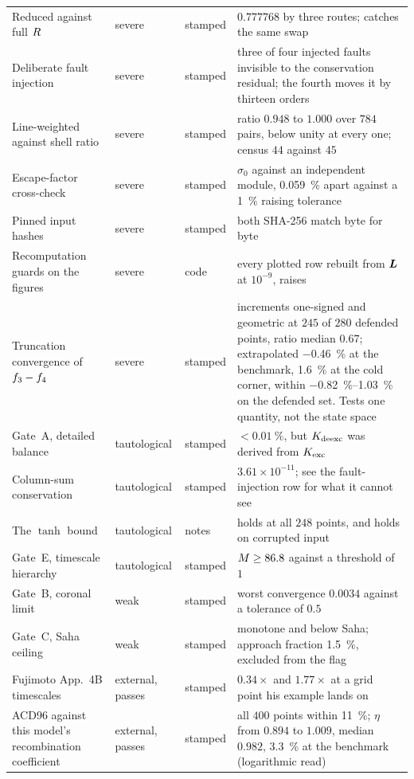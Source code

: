 \begin{table}[tbp]
\begin{tabular}{p{3.9cm}p{1.8cm}p{1.3cm}p{5.6cm}}
Reduced against full $R$ & severe & stamped & $0.777768$ by three routes; catches the same swap \\
Deliberate fault injection & severe & stamped & three of four injected faults invisible to the conservation residual; the fourth moves it by thirteen orders \\
Line-weighted against shell ratio & severe & stamped & ratio $0.948$ to $1.000$ over $784$ pairs, below unity at every one; census $44$ against $45$ \\
Escape-factor cross-check & severe & stamped & $\sigma_0$ against an independent module, \SI{0.059}{\percent} apart against a \SI{1}{\percent} raising tolerance \\
Pinned input hashes & severe & stamped & both SHA-256 match byte for byte \\
Recomputation guards on the figures & severe & code & every plotted row rebuilt from $\bm{L}$ at $10^{-9}$, raises \\
Truncation convergence of $f_{3}-f_{4}$ & severe & stamped & increments one-signed and geometric at $245$ of $280$ defended points, ratio median $0.67$; extrapolated \SI{-0.46}{\percent} at the benchmark, \SI{+1.6}{\percent} at the cold corner, within \SIrange{-0.82}{+1.03}{\percent} on the defended set. Tests one quantity, not the state space \\
Gate~A, detailed balance & tautological & stamped & $<\SI{0.01}{\percent}$, but $K_{\rm deexc}$ was derived from $K_{\rm exc}$ \\
Column-sum conservation & tautological & stamped & $3.61\times10^{-11}$; see the fault-injection row for what it cannot see \\
The $\tanh$ bound & tautological & notes & holds at all $248$ points, and holds on corrupted input \\
Gate~E, timescale hierarchy & tautological & stamped & $M \ge 86.8$ against a threshold of $1$ \\
Gate~B, coronal limit & weak & stamped & worst convergence $0.0034$ against a tolerance of $0.5$ \\
Gate~C, Saha ceiling & weak & stamped & monotone and below Saha; approach fraction \SI{1.5}{\percent}, excluded from the flag \\
\midrule
Fujimoto App.~4B timescales & external, passes & stamped & $0.34\times$ and $1.77\times$ at a grid point his example lands on \\
ACD96 against this model's recombination coefficient & external, passes & stamped & all $400$ points within \SI{11}{\percent}; $\eta$ from $0.894$ to $1.009$, median $0.982$, \SI{3.3}{\percent} at the benchmark (logarithmic read) \\

\end{tabular}
\end{table}
